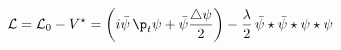 \begin{equation}
     {\cal L}={\cal L}_{0}-V^\star
     =\left(i\bar{\psi}\,\p_{t}\psi+
     \bar{\psi}\frac{\bigtriangleup\psi}{2}\right)
     -\frac{\lambda}{2}\,
     \bar{\psi}\star\bar{\psi}\star\psi\star\psi
     \label{action}
\end{equation}


